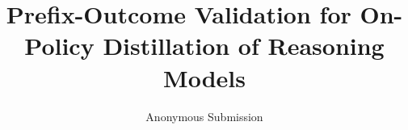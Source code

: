 \documentclass[letterpaper]{article} %
\title{Prefix-Outcome Validation for On-Policy Distillation of Reasoning Models}
\author{
    Anonymous Submission
}
\begin{document}
\maketitle

\begin{abstract}

\end{abstract}








\end{document}

